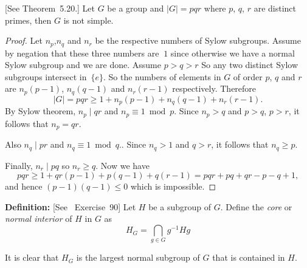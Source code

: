 \documentclass[12pt]{book}
\newcommand{\eG}{\ensuremath{\{e\}}}
\begin{document}
\begin{llem} \label{rose94:pqr}
\textnormal{\small [See \cite{Rose94} Theorem~5.20.]}
Let $G$ be a group and \(|G|=pqr\) where $p$, $q$, $r$ are distinct primes,
then $G$ is not simple.
\end{llem}
\begin{proof}
Let \(n_p\),\(n_q\) and \(n_r\) be the respective
numbers of Sylow subgroups.
Assume by negation that these three numbers are \(\>1\)
since otherwise
we have a normal Sylow subgroup and we are done.
Assume \(p>q>r\)
So any two distinct Sylow subgroups intersect in~\eG.
So the numbers of elements in $G$ of order $p$, $q$ and $r$
are
\(n_p(p-1)\), \(n_q(q-1)\) and \(n_r(r-1)\) respectively.
Therefore
\begin{equation}
|G|=pqr\geq 1 + n_p(p-1) + n_q(q-1) + n_r(r-1).
\end{equation}
By Sylow theorem, \(n_p \mid qr\) and \(n_p\equiv 1\bmod p\).
Since \(n_p>q\) and \(p>q\), \(p>r\), it follows that \(n_p=qr\).

Also \(n_q\mid pr\) and \(n_q\equiv 1\bmod q\)..
Since \(n_q>1\) and \(q>r\), it follows that \(n_q\geq p\).

Finally, \(n_r\mid pq\) so \(n_r\geq q\). Now we have
\begin{equation}
pqr \geq 1 + qr(p-1) + p(q-1) + q(r-1) = pqr + pq + qr - p - q  + 1,
\end{equation}
and hence \((p-1)(q-1)\leq 0\) which is impossible.
\end{proof}

\textbf{Definition:}
\textnormal{\small [See \cite{Rose94}~Exercise~90]}
Let $H$ be a subgroup of $G$.
Define the \emph{core} or \emph{normal interior} of $H$ in $G$ as
\begin{equation}
H_G = \bigcap_{g\in G} g^{-1}Hg
\end{equation}

It is clear that \(H_G\) is the largest normal subgroup of $G$ that
is contained in $H$.
\end{document}
